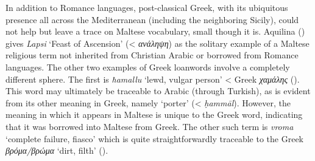 \documentclass[output=paper]{langsci/langscibook}
\begin{document}
In addition to Romance languages, post-classical Greek, with its ubiquitous presence all across the Mediterranean (including the neighboring Sicily), could not help but leave a trace on Maltese vocabulary, small though it is. Aquilina (\citeyear[23]{aquilina1976}) gives \textit{Lapsi} `Feast of Ascension' (< \textit{ανάληψη}) as the solitary example of a Maltese religious term not inherited from Christian Arabic or borrowed from Romance languages. The other two examples of Greek loanwords involve a completely different sphere. The first is \textit{ħamallu} `lewd, vulgar person' < Greek \textit{χαμάλης} (\citealt[7781]{megaleksikon1958}). This word may ultimately be traceable to Arabic (through Turkish), as is evident from its other meaning in Greek, namely `porter' (< \textit{ḥammāl}). However, the meaning in which it appears in Maltese is unique to the Greek word, indicating that it was borrowed into Maltese from Greek. The other such term is \textit{vroma} `complete failure, fiasco' which is quite straightforwardly traceable to the Greek \textit{βρόμα/βρώμα} `dirt, filth' (\citealt[1506, 1516]{megaleksikon1958}).
\end{document}

